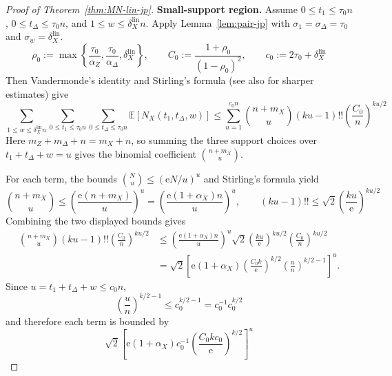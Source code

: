 \documentclass[11pt]{article}
\theoremstyle{definition}
\newcommand{\EE}{\mathbb E}
\newcommand{\NX}{N_X}
\begin{document}
\begin{proof}[Proof of Theorem~\ref{thm:MN-lin-jp}]
\smallskip
\noindent\textbf{Small-support region.}
Assume \(0\le t_1\le \tau_0 n\), \(0\le t_\Delta\le \tau_0 n\), and \(1\le w\le \delta_X^{\mathrm{lin}}n\).
Apply Lemma~\ref{lem:pair-jp} with \(\sigma_1=\sigma_\Delta=\tau_0\) and \(\sigma_w=\delta_X^{\mathrm{lin}}\).
\begin{equation*}
\rho_0:=\max\left\{\frac{\tau_0}{\alpha_Z},\frac{\tau_0}{\alpha_\Delta},\delta_X^{\mathrm{lin}}\right\},
\qquad
C_0:=\frac{1+\rho_0}{(1-\rho_0)^2},
\qquad
c_0:=2\tau_0+\delta_X^{\mathrm{lin}}
\end{equation*}
Then Vandermonde's identity \cite[Sec.~5.1, Vandermonde's convolution~(5.27)]{GKP94}
and Stirling's formula \cite[Sec.~9.6, eq.~(9.91), Table~452]{GKP94}
(see also \cite{Robbins55} for sharper estimates) give
\begin{equation*}
\sum_{1\le w\le \delta_X^{\mathrm{lin}}n}
\sum_{0\le t_1\le \tau_0 n}
\sum_{0\le t_\Delta\le \tau_0 n}
\EE[\NX(t_1,t_\Delta,w)]
\le
\sum_{u=1}^{c_0 n}
\binom{n+m_X}{u}(ku-1)!!\left(\frac{C_0}{n}\right)^{ku/2}
\end{equation*}
Here \(m_Z+m_\Delta+n=m_X+n\), so summing the three support choices over \(t_1+t_\Delta+w=u\) gives the binomial coefficient \(\binom{n+m_X}{u}\).

For each term, the bounds \(\binom{N}{u}\le (\mathrm{e}N/u)^u\) and Stirling's formula yield
\begin{equation*}
\binom{n+m_X}{u}\le \left(\frac{\mathrm{e}(n+m_X)}{u}\right)^u
=\left(\frac{\mathrm{e}(1+\alpha_X)n}{u}\right)^u,
\qquad
(ku-1)!!\le \sqrt{2}\left(\frac{ku}{\mathrm{e}}\right)^{ku/2}
\end{equation*}
Combining the two displayed bounds gives
\begin{equation*}
\begin{aligned}
\binom{n+m_X}{u}(ku-1)!!\left(\frac{C_0}{n}\right)^{ku/2}
&\le
\left(\frac{\mathrm{e}(1+\alpha_X)n}{u}\right)^u
\sqrt{2}\left(\frac{ku}{\mathrm{e}}\right)^{ku/2}
\left(\frac{C_0}{n}\right)^{ku/2} \\
&=
\sqrt{2}\left[
\mathrm{e}(1+\alpha_X)\left(\frac{C_0k}{\mathrm{e}}\right)^{k/2}
\left(\frac{u}{n}\right)^{k/2-1}
\right]^u.
\end{aligned}
\end{equation*}
Since \(u=t_1+t_\Delta+w\le c_0n\),
\begin{equation*}
\left(\frac{u}{n}\right)^{k/2-1}\le c_0^{k/2-1}=c_0^{-1}c_0^{k/2}
\end{equation*}
and therefore each term is bounded by
\begin{equation*}
\sqrt{2}\left[
\mathrm{e}(1+\alpha_X)c_0^{-1}\left(\frac{C_0kc_0}{\mathrm{e}}\right)^{k/2}
\right]^u
\end{equation*}


\end{proof}
\end{document}
